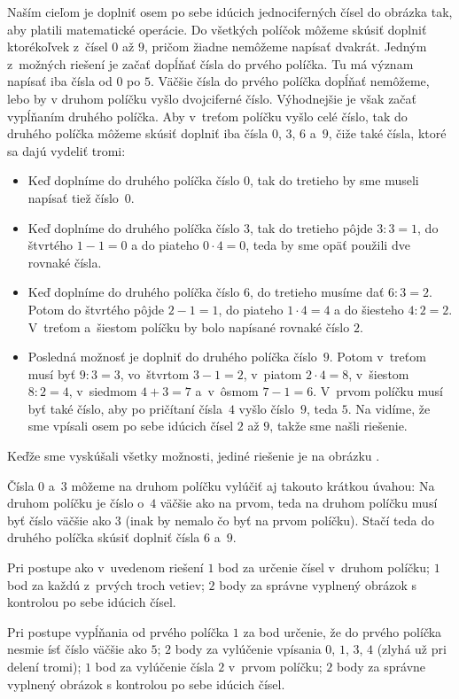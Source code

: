 {%
Naším cieľom je doplniť osem po sebe idúcich jednociferných čísel do obrázka tak, aby platili matematické operácie. Do všetkých políčok môžeme skúsiť doplniť ktorékoľvek z~čísel $0$ až $9$, pričom žiadne nemôžeme napísať dvakrát. Jedným z~možných riešení je začať dopĺňať čísla do prvého políčka. Tu má význam napísať iba čísla od $0$ po $5$. Väčšie čísla do prvého políčka dopĺňať nemôžeme, lebo by v druhom políčku vyšlo dvojciferné číslo.
Výhodnejšie je však začať vypĺňaním druhého políčka. Aby v~treťom políčku vyšlo celé číslo, tak do druhého políčka môžeme skúsiť doplniť iba čísla $0$, $3$, $6$ a~$9$, čiže také čísla, ktoré sa dajú vydeliť tromi:
\begin{itemize}
  \item Keď doplníme do druhého políčka číslo $0$, tak do tretieho by sme museli napísať tiež číslo~$0$.
  \item Keď doplníme do druhého políčka číslo $3$, tak do tretieho pôjde $3:3=1$, do štvrtého $1-1=0$ a do piateho $0\cdot 4=0$, teda by sme opäť použili dve rovnaké čísla.
  \item Keď doplníme do druhého políčka číslo $6$, do tretieho musíme dať $6:3=2$. Potom do štvrtého pôjde $2-1=1$, do piateho $1\cdot 4 =4$ a do šiesteho $4:2=2$. V~treťom a~šiestom políčku by bolo napísané rovnaké číslo $2$.
   \item Posledná možnosť je doplniť do druhého políčka číslo~$9$. Potom v~treťom musí byť $9:3=3$, vo~štvrtom
$3-1=2$, v~piatom $2\cdot 4=8$, v~šiestom $8:2=4$, v~siedmom $4+3=7$ a~v~ôsmom $7-1=6$. V~prvom políčku musí byť také číslo, aby po pričítaní čísla~$4$ vyšlo číslo~$9$, teda $5$. Na \obr{} vidíme, že sme vpísali
osem po sebe idúcich čísel $2$ až $9$, takže sme našli riešenie.
\end{itemize}
\noindent
Keďže sme vyskúšali všetky možnosti, jediné riešenie je na obrázku .
%

\poznamka
Čísla $0$ a~$3$ môžeme na druhom políčku vylúčiť aj takouto krátkou úvahou: Na druhom políčku je číslo o~$4$ väčšie ako na prvom, teda na druhom políčku musí byť číslo väčšie ako $3$ (inak by nemalo čo byť na prvom políčku). Stačí teda do druhého políčka skúsiť doplniť čísla $6$ a~$9$.


\hodnotenie
Pri postupe ako v~uvedenom riešení $1$ bod za určenie čísel v~druhom políčku; $1$ bod za každú z~prvých troch vetiev; $2$ body za správne vyplnený obrázok s kontrolou po sebe idúcich čísel.

Pri postupe vypĺňania od prvého políčka $1$ za bod určenie, že do prvého políčka nesmie ísť číslo väčšie ako $5$;
$2$ body za vylúčenie vpísania $0$, $1$, $3$, $4$ (zlyhá už pri delení tromi); $1$ bod za vylúčenie čísla $2$ v~prvom políčku; $2$ body za správne vyplnený obrázok s kontrolou po sebe idúcich čísel.
\endhodnotenie
}

